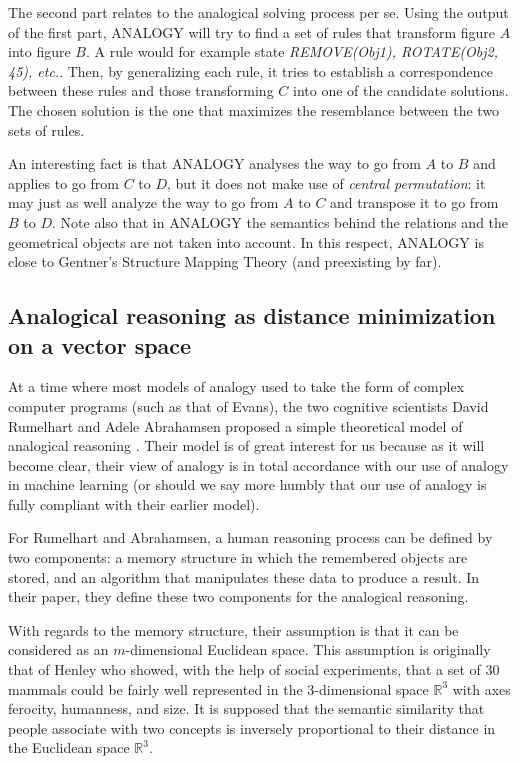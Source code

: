 The second part relates to the analogical solving process per se. Using the
output of the first part, ANALOGY will try to find a set of rules that
transform figure $A$ into figure $B$. A rule would for example state
\textit{REMOVE(Obj1), ROTATE(Obj2, 45\degree), etc.}. Then, by generalizing
each rule, it tries to establish a correspondence between these rules and those
transforming $C$ into one of the candidate solutions. The chosen solution is
the one that maximizes the resemblance between the two sets of rules.

An interesting fact is that ANALOGY analyses the way to go from $A$ to $B$ and
applies to go from $C$ to $D$, but it does not make use of \textit{central
permutation}: it may just as well analyze the way to go from $A$ to $C$ and
transpose it to go from $B$ to $D$. Note also that in ANALOGY the semantics
behind the relations and the geometrical objects are not taken into account. In
this respect, ANALOGY is close to Gentner's Structure Mapping Theory (and
preexisting by far).


\subsection{Analogical reasoning as distance minimization on a vector space}
\label{SEC:rumelhart_Abrahamsen}

At a time where most models of analogy used to take the form of complex computer
programs (such as that of Evans), the two cognitive scientists David Rumelhart
and Adele Abrahamsen proposed a simple theoretical model of analogical
reasoning \cite{RumAbr73}. Their model is of great interest for us because as
it will become clear, their view of analogy is in total accordance with our use
of analogy in machine learning (or should we say more humbly that our use of
analogy is fully compliant with their earlier model).

For Rumelhart and Abrahamsen, a human reasoning process can be defined by two
components: a memory structure in which the remembered objects are stored, and
an algorithm that manipulates these data to produce a result. In their paper,
they define these two components for the analogical reasoning.

With regards to the memory structure, their assumption is that it can be
considered as an $m$-dimensional Euclidean space. This assumption is originally
that of Henley \cite{Hen69} who showed, with the help of social experiments,
that a set of 30 mammals could be fairly well represented in the 3-dimensional
space $\mathbb{R}^3$ with axes ferocity, humanness, and size. It is supposed
that the semantic similarity that people associate with two concepts is
inversely proportional to their distance in the Euclidean space $\mathbb{R}^3$.

